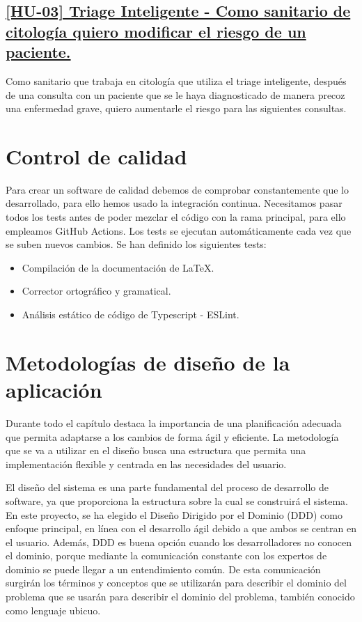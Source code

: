 \subsection*{\href{https://github.com/RubenDelgadoPareja/TFG-Triage-Inteligente-Consulta-Medica/issues/5}{[HU-03] Triage Inteligente - Como sanitario de citología quiero modificar el riesgo de un paciente.}}
Como sanitario que trabaja en citología que utiliza el triage inteligente, después de una consulta con un paciente que se le haya diagnosticado de manera precoz una enfermedad grave,
quiero aumentarle el riesgo para las siguientes consultas.

\section{Control de calidad}
\label{sc:control-calidad}
Para crear un software de calidad debemos de comprobar constantemente que lo desarrollado, para ello hemos usado la integración continua.
Necesitamos pasar todos los tests antes de poder mezclar el código con la rama principal, para ello empleamos GitHub Actions.
Los tests se ejecutan automáticamente cada vez que se suben nuevos cambios. Se han definido los siguientes tests:

\begin{itemize}
    \item{Compilación de la documentación de LaTeX.}
    \item{Corrector ortográfico y gramatical.}
    \item{Análisis estático de código de Typescript - ESLint.}
\end{itemize}

\section{Metodologías de diseño de la aplicación}
Durante todo el capítulo destaca la importancia de una planificación adecuada que permita adaptarse a los cambios de forma ágil y eficiente.
La metodología que se va a utilizar en el diseño busca una estructura que permita una implementación flexible y centrada en las necesidades del usuario.

El diseño del sistema es una parte fundamental del proceso de desarrollo de software, ya que proporciona la estructura sobre la cual se construirá el sistema.
En este proyecto, se ha elegido el Diseño Dirigido por el Dominio (DDD) \cite{domain-drive-design} como enfoque principal, en línea con el desarrollo ágil debido a que ambos se centran en el usuario.
Además, DDD es buena opción cuando los desarrolladores no conocen el dominio, porque mediante la comunicación constante con los expertos de dominio se puede llegar a un entendimiento común.
De esta comunicación surgirán los términos y conceptos que se utilizarán para describir el dominio del problema que se usarán para describir el dominio del problema, también conocido como lenguaje ubicuo.

